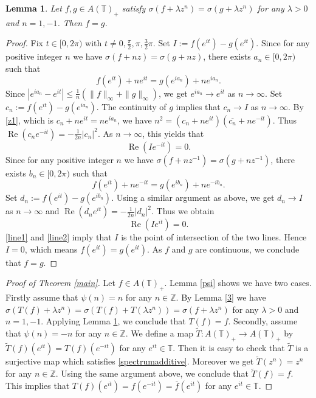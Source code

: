 \documentclass[10pt]{amsart}
\newtheorem{lemma}[theorem]{Lemma}
\begin{document}
\begin{lemma}\label{d1}
Let $f, g \in A(\mathbb{T})_{+}$ satisfy $\sigma(f+ \lambda z^{n})=\sigma(g+\lambda z^{n})$ for any $\lambda >0$ and $n=1,-1$. Then $f=g$.
\end{lemma}
\begin{proof}
Fix $t \in [0, 2\pi)$ with $t \neq 0, \frac{\pi}{2}, \pi, \frac{3}{2}\pi$. Set $I:=f(e^{it})-g(e^{it})$. Since for any positive integer $n$ we have $\sigma(f+ n z)=\sigma(g+n z)$,  there exists $a_n \in [0, 2\pi)$ such that 
\begin{equation}\label{z1}
f(e^{it})+n e^{it}=g(e^{i a_n})+ne^{i a_n}. 
\end{equation}
Since $|e^{i a_n}- e^{it}| \le \frac{1}{n} (\|f\|_{\infty}+\|g\|_{\infty})$, we get $e^{i a_n} \to e^{it}$ as $n \to \infty$.  Set $c_n:=f(e^{it})-g(e^{i a_n})$. The continuity of $g$ implies that $c_n \to I$ as $n \to \infty$. By \eqref{z1}, which is $c_n+n e^{it}=ne^{i a_n}$, we have $n^2=(c_n+n e^{it})(\overline{c_n}+n e^{-it})$. Thus $\operatorname{Re}(c_n e^{-it})=-\frac{1}{2n}|c_n|^2$. As $n \to \infty$, this yields that
\begin{equation}\label{line1}
\operatorname{Re}(I e^{-it})=0. 
\end{equation}
Since for any positive integer $n$ we have $\sigma(f+ n z^{-1})=\sigma(g+n z^{-1})$,  there exists $b_n \in [0, 2\pi)$ such that 
\begin{equation*}\label{z2}
f(e^{it})+n e^{-it}=g(e^{i b_n})+ne^{-i b_n}. 
\end{equation*}
Set  $d_n:=f(e^{it})-g(e^{i b_n})$. Using a similar argument as above, we get $d_n \to I$ as $n \to \infty$ and $\operatorname{Re}(d_n e^{it})=-\frac{1}{2n}|d_n|^2$. Thus we obtain
\begin{equation}\label{line2}
\operatorname{Re}(I e^{it})=0. 
\end{equation}
\eqref{line1} and \eqref{line2} imply that  $I$ is the point of intersection of the two lines.  Hence $I=0$, which means $f(e^{it})=g(e^{it})$. As $f$ and $g$ are continuous, we conclude that $f=g$.
\end{proof}

\begin{proof}[Proof of Theorem \ref{main}]
Let $f \in A(\mathbb{T})_{+}$. Lemma \ref{psi} shows we have two cases. Firstly assume that $\psi(n)=n$ for any $n \in \mathbb{Z}$.  By Lemma \ref{3} we have $\sigma(T(f)+\lambda z^{n})=\sigma(T(f)+ T(\lambda z^{n}))=\sigma(f+\lambda z^{n})$ for any $\lambda>0$ and $n=1,-1$. Applying Lemma \ref{d1}, we conclude that $T(f)=f$. Secondly, assume that $\psi(n)=-n$ for any $n \in \mathbb{Z}$. We define a map $\widetilde{T}: A(\mathbb{T})_{+} \to A(\mathbb{T})_{+}$ by $\widetilde{T}(f)(e^{it})=T(f)(e^{-it})$ for any $e^{it} \in \mathbb{T}$. Then it is easy to check that $\widetilde{T}$ is a surjective map which satisfies \eqref{spectrumadditive}. Moreover we get $\widetilde{T}(z^n)=z^{n}$ for any $n \in \mathbb{Z}$. Using the same argument above, we conclude that $\widetilde{T}(f)=f$. This implies that $T(f)(e^{it})=f(e^{-it})=\overline{f}(e^{it})$ for any $e^{it} \in \mathbb{T}$. 
\end{proof}
\end{document}

